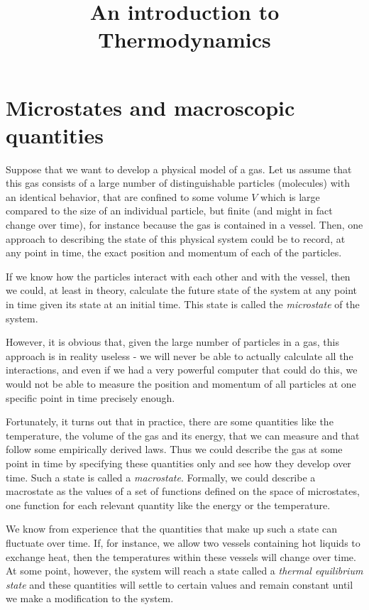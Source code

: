 \documentclass[a4paper, draft]{article}
\title{An introduction to Thermodynamics}
\theoremstyle{own}
\theoremstyle{remark}
\begin{document}
\maketitle

\tableofcontents


\section{Microstates and macroscopic quantities}

Suppose that we want to develop a physical model of a gas. Let us assume that this gas consists of a large number of distinguishable particles (molecules) with an identical behavior, that are confined to some volume $V$ which is large compared to the size of an individual particle, but finite (and might in fact change over time), for instance because the gas is contained in a vessel. Then, one approach to describing the state of this physical system could be to record, at any point in time, the exact position and momentum of each of the particles.

If we know how the particles interact with each other and with the vessel, then we could, at least in theory, calculate the future state of the system at any point in time given its state at an initial time. This state is called the {\em microstate} of the system.

However, it is obvious that, given the large number of particles in a gas, this approach is in reality useless - we will never be able to actually calculate all the interactions, and even if we had a very powerful computer that could do this, we would not be able to measure the position and momentum of all particles at one specific point in time precisely enough. 

Fortunately, it turns out that in practice, there are some quantities like the temperature, the volume of the gas and its energy, that we can measure and that follow some empirically derived laws. Thus we could describe the gas at some point in time by specifying these quantities only and see how they develop over time. Such a state is called a {\em macrostate}. Formally, we could describe a macrostate as the values of a set of functions defined on the space of microstates, one function for each relevant quantity like the energy or the temperature. 

We know from experience that the quantities that make up such a state can fluctuate over time. If, for instance, we allow two vessels containing hot liquids to exchange heat, then the temperatures within these vessels will change over time. At some point, however, the system will reach a state called a {\em thermal equilibrium state} and these quantities will settle to certain values and remain constant until we make a modification to the system.
\end{document}
